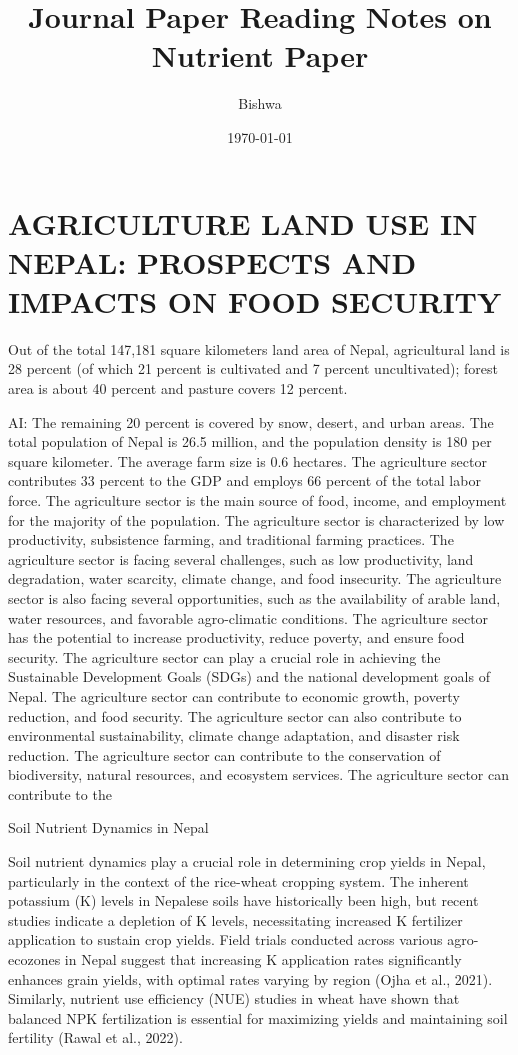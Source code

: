 \documentclass[a4paper,12pt]{article}
\title{Journal Paper Reading Notes on Nutrient Paper}
\author{Bishwa}
\date{\today}
\begin{document}
\maketitle



\section{AGRICULTURE LAND USE IN NEPAL: PROSPECTS AND IMPACTS ON FOOD SECURITY}
\parencite{timilsinaAGRICULTURELANDUSE2019}
Out of the total 147,181 square kilometers land area of Nepal, agricultural land is 28 percent (of which 21 percent is cultivated and 7 percent uncultivated); forest area is about 40 percent and pasture covers 12 percent.

AI: The remaining 20 percent is covered by snow, desert, and urban areas. The total population of Nepal is 26.5 million, and the population density is 180 per square kilometer. The average farm size is 0.6 hectares. The agriculture sector contributes 33 percent to the GDP and employs 66 percent of the total labor force. The agriculture sector is the main source of food, income, and employment for the majority of the population. The agriculture sector is characterized by low productivity, subsistence farming, and traditional farming practices. The agriculture sector is facing several challenges, such as low productivity, land degradation, water scarcity, climate change, and food insecurity. The agriculture sector is also facing several opportunities, such as the availability of arable land, water resources, and favorable agro-climatic conditions. The agriculture sector has the potential to increase productivity, reduce poverty, and ensure food security. The agriculture sector can play a crucial role in achieving the Sustainable Development Goals (SDGs) and the national development goals of Nepal. The agriculture sector can contribute to economic growth, poverty reduction, and food security. The agriculture sector can also contribute to environmental sustainability, climate change adaptation, and disaster risk reduction. The agriculture sector can contribute to the conservation of biodiversity, natural resources, and ecosystem services. The agriculture sector can contribute to the


Soil Nutrient Dynamics in Nepal

Soil nutrient dynamics play a crucial role in determining crop yields in Nepal, particularly in the context of the rice-wheat cropping system. The inherent potassium (K) levels in Nepalese soils have historically been high, but recent studies indicate a depletion of K levels, necessitating increased K fertilizer application to sustain crop yields. Field trials conducted across various agro-ecozones in Nepal suggest that increasing K application rates significantly enhances grain yields, with optimal rates varying by region (Ojha et al., 2021). Similarly, nutrient use efficiency (NUE) studies in wheat have shown that balanced NPK fertilization is essential for maximizing yields and maintaining soil fertility (Rawal et al., 2022).
\end{document}
